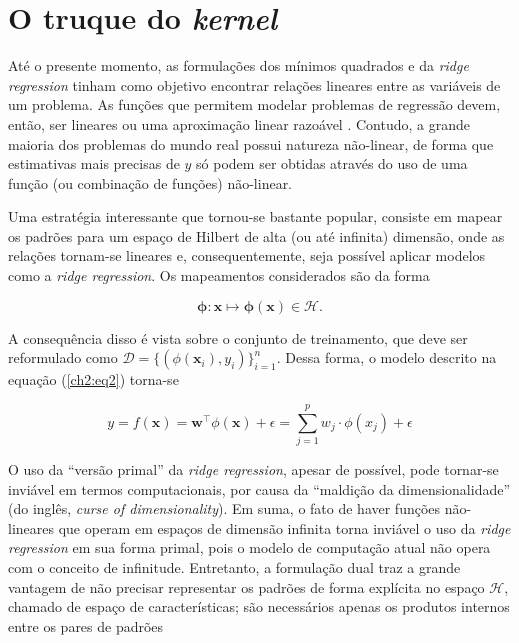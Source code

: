 \section{O truque do \textit{kernel}} \label{sec:kernel-trick}
Até o presente momento, as formulações dos mínimos quadrados e da \textit{ridge regression} tinham como objetivo encontrar relações lineares entre as variáveis de um problema. As funções que permitem modelar problemas de regressão devem, então, ser lineares ou uma aproximação linear razoável \cite{hastie2009}. Contudo, a grande maioria dos problemas do mundo real possui natureza não-linear, de forma que estimativas mais precisas de $y$ só podem ser obtidas através do uso de uma função (ou combinação de funções) não-linear.

Uma estratégia interessante que tornou-se bastante popular, consiste em mapear os padrões para um espaço de Hilbert de alta (ou até infinita) dimensão, onde as relações tornam-se lineares e, consequentemente, seja possível aplicar modelos como a \textit{ridge regression}. Os mapeamentos considerados são da forma

\begin{equation}
    \label{ch2:eq24}
    \mathbf{\phi} : \mathbf{x} \mapsto \mathbf{\phi}(\mathbf{x}) \in \mathcal{H}.
\end{equation}

\noindent A consequência disso é vista sobre o conjunto de treinamento, que deve ser reformulado como $\mathcal{D} = \{(\phi(\mathbf{x}_i), y_i)\}^{n}_{i=1}$. Dessa forma, o modelo descrito na equação (\ref{ch2:eq2}) torna-se

\begin{equation}
    \label{ch2:eq25}
    y = f(\mathbf{x}) = \mathbf{w}^{\top} \phi(\mathbf{x}) + \epsilon = \sum_{j=1}^{p}{w_j \cdot \phi(x_j)} + \epsilon
\end{equation}

O uso da ``versão primal'' da \textit{ridge regression}, apesar de possível, pode tornar-se inviável em termos computacionais, por causa da ``maldição da dimensionalidade'' (do inglês, \textit{curse of dimensionality}). Em suma, o fato de haver funções não-lineares que operam em espaços de dimensão infinita torna inviável o uso da \textit{ridge regression} em sua forma primal, pois o modelo de computação atual não opera com o conceito de infinitude. Entretanto, a formulação dual traz a grande vantagem de não precisar representar os padrões de forma explícita no espaço $ \mathcal{H}$, chamado de espaço de características; são necessários apenas os produtos internos entre os pares de padrões

